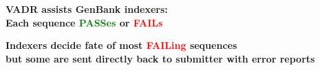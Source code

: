 \documentclass[landscape]{slides}
\begin{document}
\begin{slide}
\begin{center}
\large{\textbf{VADR assists GenBank indexers: \\ Each sequence \textcolor{green}{PASSes} or \textcolor{red}{FAILs}}}
\end{center}


\vfill
\end{slide}
\begin{slide}
\begin{center}
\textbf{Indexers decide fate of most \textcolor{red}{FAILing} sequences\\ but some are sent directly back to submitter with error reports}
\end{center}


\vfill
\end{slide}
\end{document}
